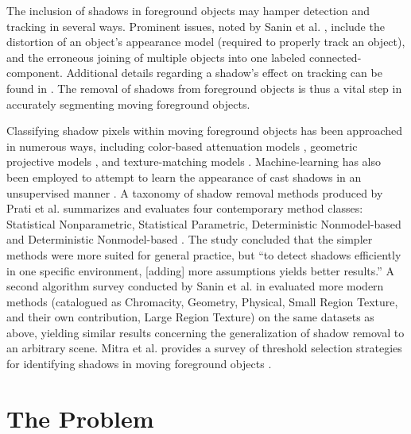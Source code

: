 The inclusion of shadows in foreground objects may hamper detection and tracking in several ways. Prominent issues, noted by Sanin et al. \cite{sanin2012shadow}, include the distortion of an object's appearance model (required to properly track an object), and the erroneous joining of multiple objects into one labeled connected-component. Additional details regarding a shadow's effect on tracking can be found in \cite{nadimi2004physical, mitra2007shadow}. The removal of shadows from foreground objects is thus a vital step in accurately segmenting moving foreground objects.

Classifying shadow pixels within moving foreground objects has been approached in numerous ways, including color-based attenuation models \cite{cucchiara2003detecting, salvador2004cast, cavallaro2005shadow, chen2010enhanced, sun2010moving}, geometric projective models \cite{hsieh2003shadow, yoneyama2003moving, nicolas2006joint, fang2008method, chen2010human}, and texture-matching models \cite{javed2002hierarchical, tian2005robust, leone2007shadow, zhang2007moving, nghiem2008shadow, sanin2010improved}. Machine-learning has also been employed to attempt to learn the appearance of cast shadows in an unsupervised manner \cite{liu2007cast, martel2007learning, joshi2008learning, huang2009moving}. A taxonomy of shadow removal methods produced by Prati et al. summarizes and evaluates four contemporary method classes: Statistical Nonparametric, Statistical Parametric, Deterministic Nonmodel-based and Deterministic Nonmodel-based \cite{prati2003detecting}. The study concluded that the simpler methods were more suited for general practice, but ``to detect shadows efficiently in one specific environment, [adding] more assumptions yields better results.'' A second algorithm survey conducted by Sanin et al. in \cite{sanin2012shadow} evaluated more modern methods (catalogued as Chromacity, Geometry, Physical, Small Region Texture, and their own contribution, Large Region Texture) on the same datasets as above, yielding similar results concerning the generalization of shadow removal to an arbitrary scene. Mitra et al. provides a survey of threshold selection strategies for identifying shadows in moving foreground objects \cite{mitra2007shadow}.

\section{The Problem}

